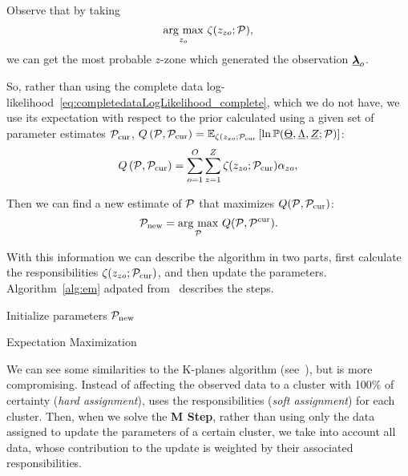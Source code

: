 \documentclass{ifacconf}  %
\begin{document}
Observe that by taking
\begin{equation}\label{eq:argmaxz}
\underset{z_{o}}{\argmax}\ {\zeta(z_{zo};\set{P})},
\end{equation}
we can get the most probable $z$-zone which generated the observation $\randomvec{\lambda}_{o}$.


So, rather than using the complete data log-likelihood~\eqref{eq:completedataLogLikelihood_complete}, which we do not have, we use its expectation with respect to the prior calculated using a given set of parameter estimates $\set{P}_{\mathrm{cur}}$,  ${Q\left(\set{P},\set{P}_{\mathrm{cur}}\right)=\expectation[{\zeta(z_{zo};\set{P}_{\mathrm{cur}}}]{\ln\probability{\random{\Theta},\random{\Lambda},\random{Z};\set{P}}}}$:
\begin{equation}
  \label{eq:completedataLogLikelihood_expectation}
 Q\left(\set{P},\set{P}_{\mathrm{cur}}\right) =
  \sum_{o=1}^{O}\sum_{z=1}^{Z}  \zeta(z_{zo};\set{P}_{\mathrm{cur}})\alpha_{zo}
      ,
\end{equation}


Then we can find a new estimate of $\set{P}$ that maximizes $Q(\set{P},\set{P}_{\mathrm{cur}})$:
\begin{equation} \label{eq:Mstep}
  \set{P}_{\mathrm{new}}=\underset{\set{P}}{\argmax}\ Q(\set{P},\set{P}^{\mathrm{cur}}).
\end{equation}

With this information we can describe the \EM{} algorithm in two parts, first calculate the responsibilities $\zeta(z_{zo};\set{P}_{\mathrm{cur}})$, and then update the parameters.
Algorithm~\ref{alg:em} adpated from~\mbox{\cite[Chapter 9]{Bishop2006}} describes the steps.

\begin{algorithm2e}[h]
  \DontPrintSemicolon%
  Initialize parameters $\set{P}_{\mathrm{new}}$\;
 \caption{Expectation Maximization}\label{alg:em}
\end{algorithm2e}

We can see some similarities to the K-planes algorithm (see~\cite{BradleyMangasarian2000}), but \EM{} is more compromising.
Instead of affecting the observed data to a cluster with 100\% of certainty (\emph{hard assignment}), \EM{} uses the responsibilities (\emph{soft assignment}) for each cluster.
Then, when we solve the \textbf{M Step}, rather than using only the data assigned to update the parameters of a certain cluster, we take into account all data, whose contribution to the update is weighted by their associated responsibilities.
\end{document}
